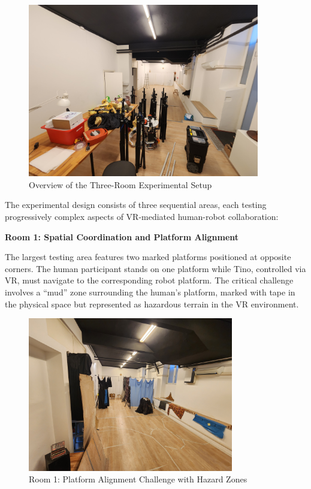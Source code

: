 \begin{figure}[H]
    \centering
    \includegraphics[width=0.9\textwidth]{Images/LabExperimentBefore.jpg}
    \caption{Overview of the Three-Room Experimental Setup}
    \label{fig:lab_experiment_overview}
\end{figure}

The experimental design consists of three sequential areas, each testing progressively complex aspects of VR-mediated human-robot collaboration:

\textbf{Room 1: Spatial Coordination and Platform Alignment}

The largest testing area features two marked platforms positioned at opposite corners. The human participant stands on one platform while Tino, controlled via VR, must navigate to the corresponding robot platform. The critical challenge involves a ``mud'' zone surrounding the human's platform, marked with tape in the physical space but represented as hazardous terrain in the VR environment.

\begin{figure}[H]
    \centering
    \includegraphics[width=0.8\textwidth]{Images/LabVisualAids (4).jpg}
    \caption{Room 1: Platform Alignment Challenge with Hazard Zones}
    \label{fig:room1_platform_challenge}
\end{figure}

